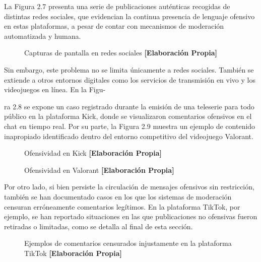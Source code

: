 La Figura 2.7 presenta una serie de publicaciones auténticas recogidas de distintas redes sociales, que evidencian la continua presencia de lenguaje ofensivo en estas plataformas, a pesar de contar con mecanismos de moderación automatizada y humana.

\begin{figure}[h!]
    \centering
    \caption{Capturas de pantalla en redes sociales \textbf{[Elaboración Propia]}}
\end{figure}

Sin embargo, este problema no se limita únicamente a redes sociales. También se extiende a otros entornos digitales como los servicios de transmisión en vivo y los videojuegos en línea. En la Figu-







\vspace{0.5cm}

ra 2.8 se expone un caso registrado durante la emisión de una teleserie para todo público en la plataforma Kick, donde se visualizaron comentarios ofensivos en el chat en tiempo real. Por su parte, la Figura 2.9 muestra un ejemplo de contenido inapropiado identificado dentro del entorno competitivo del videojuego Valorant.

\begin{figure}[h!]
    \centering
    \caption{Ofensividad en Kick \textbf{[Elaboración Propia]}}
\end{figure}

\begin{figure}[h!]
    \centering
    \caption{Ofensividad en Valorant \textbf{[Elaboración Propia]}}
\end{figure}

Por otro lado, si bien persiste la circulación de mensajes ofensivos sin restricción, también se han documentado casos en los que los sistemas de moderación censuran erróneamente comentarios legítimos. En la plataforma TikTok, por ejemplo, se han reportado situaciones en las que publicaciones no ofensivas fueron retiradas o limitadas, como se detalla al final de esta sección.



\vspace{0.5cm}

\begin{figure}[h!]
    \centering
    \caption{Ejemplos de comentarios censurados injustamente en la plataforma TikTok \textbf{[Elaboración Propia]}}
\end{figure}





